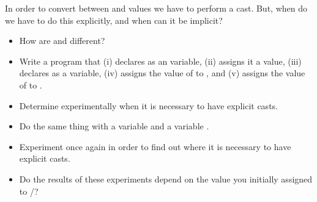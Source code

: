 In order to convert between  and  values we have to perform a cast. But, when do we have to do this explicitly, and when can it be implicit?

\begin{itemize}
  \item How are  and  different?
  \item Write a program that (i) declares  as an  variable, (ii) assigns it a value, (iii) declares  as a  variable, (iv) assigns the value of  to , and (v) assigns the value of  to .
  \item Determine experimentally when it is necessary to have explicit casts.
  \item Do the same thing with a  variable  and a  variable .
  \item Experiment once again in order to find out where it is necessary to have explicit casts.
  \item Do the results of these experiments depend on the value you initially assigned to /?
\end{itemize}
